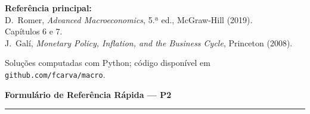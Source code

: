 \documentclass[12pt, a4paper]{article}
\begin{document}
\begin{titlepage}
\begin{center}
\vspace{1.5em}
\begin{tcolorbox}[standard, colback=boxbg, colframe=boxborder, width=0.88\textwidth,
  arc=4pt, boxrule=1pt, left=8pt, right=8pt, top=6pt, bottom=6pt]
\centering
\textbf{Referência principal:} \\[0.3em]
D.\ Romer, \textit{Advanced Macroeconomics}, 5.ª ed., McGraw-Hill (2019). \\
Capítulos 6 e 7. \\[0.3em]
J.\ Galí, \textit{Monetary Policy, Inflation, and the Business Cycle}, Princeton (2008).
\end{tcolorbox}

\vfill
{\small Soluções computadas com Python; código disponível em
\texttt{github.com/fcarva/macro}.}
\end{center}
\end{titlepage}

\newpage
\thispagestyle{fancy}

\begin{center}
{\large\bfseries\color{cyanrbc} Formulário de Referência Rápida --- P2}\\[0.3em]
\rule{\linewidth}{0.6pt}
\end{center}
\end{document}
